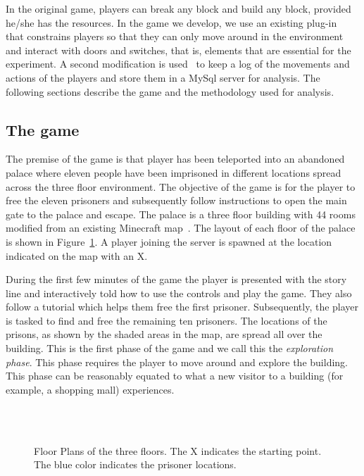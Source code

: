 In the original game, players can break any block and build any block, provided he/she has the resources. In the game we develop, we use an existing plug-in~\cite{BukkitPermissions} that constrains players so that they can only move around in the environment and interact with doors and switches, that is, elements that are essential for the experiment. A second modification is used~\cite{MyStatisticsPlugin} to keep a log of the movements and actions of the players and store them in a MySql server for analysis. The following sections describe the game and the methodology used for analysis.


\subsection{The game}
\label{sec:the_game}


The premise of the game is that player has been teleported into an abandoned palace where eleven people have been imprisoned in different locations spread across the three floor environment. The objective of the game is for the player to free the eleven prisoners and subsequently follow instructions to open the main gate to the palace and escape. The palace is a three floor building with 44 rooms modified from an existing Minecraft map~\cite{RoyalPalaceMap}. The layout of each floor of the palace is shown in Figure~\ref{fig:FloorPlans}. A player joining the server is spawned at the location indicated on the map with an X.

During the first few minutes of the game the player is presented with the story line and interactively told how to use the controls and play the game. They also follow a tutorial which helps them free the first prisoner. Subsequently, the player is tasked to find and free the remaining ten prisoners. The locations of the prisons, as shown by the shaded areas in the map, are spread all over the building. This is the first phase of the game and we call this the \emph{exploration phase}. This phase requires the player to move around and explore the building. This phase can be reasonably equated to what a new visitor to a building (for example, a shopping mall) experiences.



\begin{figure}[!tb]
  \centering
   \\
  \\
  \caption{Floor Plans of the three floors. The X indicates the starting point. The blue color indicates the prisoner locations.}
  \label{fig:FloorPlans}
\end{figure}



